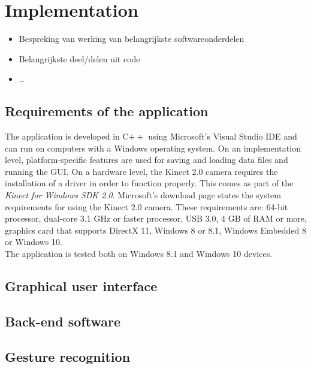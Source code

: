 \chapter{Implementation}

\begin{itemize}
\item Bespreking van werking van belangrijkste softwareonderdelen
\item Belangrijkste deel/delen uit code
\item \ldots
\end{itemize}


\section{Requirements of the application}

The application is developed in C$++$ using Microsoft's Visual Studio IDE and can run on computers with a Windows operating system. On an implementation level, platform-specific features are used for saving and loading data files and running the GUI. On a hardware level, the Kinect 2.0 camera requires the installation of a driver in order to function properly. This comes as part of the \emph{Kinect for Windows SDK 2.0}. Microsoft's download page states the system requirements for using the Kinect 2.0 camera. These requirements are: 64-bit processor, dual-core 3.1 GHz or faster processor, USB 3.0, 4 GB of RAM or more, graphics card that supports DirectX 11, Windows 8 or 8.1, Windows Embedded 8 or Windows 10.\\

The application is tested both on Windows 8.1 and Windows 10 devices.\\



\section{Graphical user interface}




\section{Back-end software}




\section{Gesture recognition}

